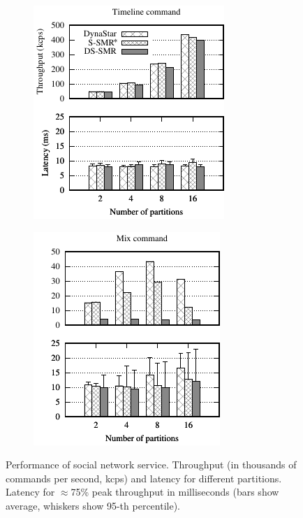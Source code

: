 \begin{figure}[h!]
  \centering
  \begin{subfigure}{.4\textwidth}
    \includegraphics[width=.9\textwidth]{figures/experiments/dynastar/chirper-compare-timeline}
    \caption{}
  \end{subfigure}
  \begin{subfigure}{.4\textwidth}
    \includegraphics[width=.9\textwidth]{figures/experiments/dynastar/chirper-compare-mix}
    \caption{}
  \end{subfigure}
  \caption{Performance of social network service. Throughput (in thousands of commands per second, kcps) and latency for different partitions.
  Latency for $\approx$75\% peak throughput in milliseconds (bars show average, whiskers show 95-th percentile).}
  \label{fig:socialscalability}
\end{figure}
